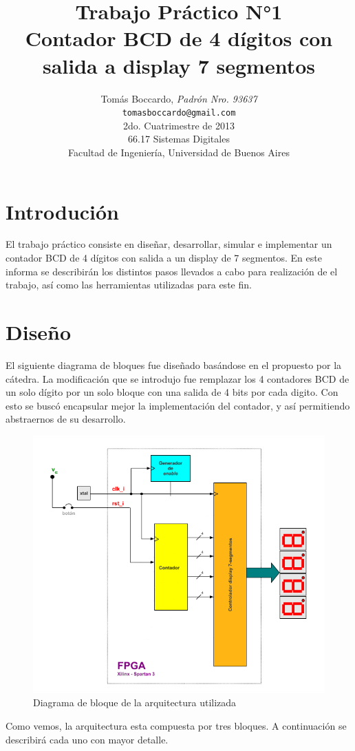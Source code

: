 \documentclass[a4paper,10pt]{article}
\title{		\textbf{Trabajo Práctico N°1} \\Contador BCD de 4 dígitos con salida a display 7 segmentos }
\author{
            Tomás Boccardo, \textit{Padrón Nro. 93637}                     \\ 
            \texttt{tomasboccardo@gmail.com}                                              \\[4ex]
            \normalsize{2do. Cuatrimestre de 2013}                                      \\ [2.5ex]
            \normalsize{66.17 Sistemas Digitales}  \\
            \normalsize{Facultad de Ingeniería, Universidad de Buenos Aires}            \\ [3ex]
       }
\begin{document}
\maketitle
\thispagestyle{empty}   %
\newpage
\tableofcontents
\newpage
\section{Introdución}
El trabajo práctico consiste en diseñar, desarrollar, simular e implementar un contador BCD de 4 dígitos con salida a un display de  7 segmentos. En este informa se describirán los distintos pasos llevados a cabo para realización de el trabajo, así como las herramientas utilizadas para este fin.

\section{Diseño}
El siguiente diagrama de bloques fue diseñado basándose en el propuesto por la cátedra. La modificación que se introdujo fue remplazar los 4 contadores BCD de un solo dígito por un solo bloque con una salida de 4 bits por cada digito. Con esto se buscó encapsular mejor la implementación del contador, y así permitiendo abstraernos de su desarrollo.
	\begin{figure}[H]
		\centering
		\includegraphics[scale=0.5]{diagBloques_global2.png}
		\caption{Diagrama de bloque de la arquitectura utilizada}
		\label{fig:diag_glob}
	\end{figure}
Como vemos, la arquitectura esta compuesta por tres bloques. A continuación se describirá cada uno con mayor detalle.
\end{document}
